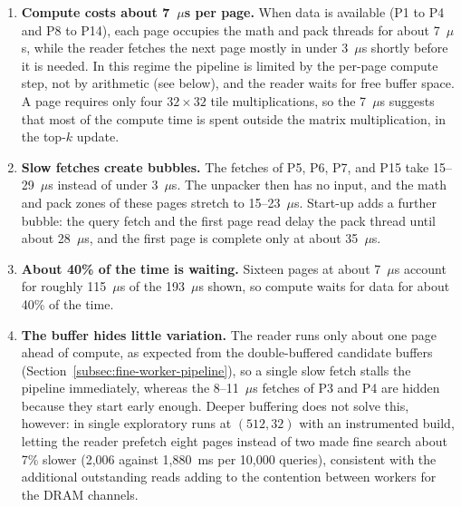 \begin{enumerate}
    \item \textbf{Compute costs about 7~\(\mu\)s per page.} When data is
    available (P1 to P4 and P8 to P14), each page occupies the math and pack
    threads for about 7~\(\mu\)s, while the reader fetches the next
    page mostly in under 3~\(\mu\)s shortly before it is needed. In this regime
    the pipeline is limited by the per-page compute step, not by arithmetic
    (see below), and the reader waits for free buffer space. A
    page requires only four \(32\times32\) tile multiplications, so the
    7~\(\mu\)s suggests that most of the compute time is spent outside the
    matrix multiplication, in the top-\(k\) update.
    \item \textbf{Slow fetches create bubbles.} The fetches of P5, P6, P7, and
    P15 take 15--29~\(\mu\)s instead of under 3~\(\mu\)s. The unpacker then has no
    input, and the math and pack zones of these pages stretch to
    15--23~\(\mu\)s. Start-up adds a further bubble: the query fetch and the
    first page read delay the pack thread until about 28~\(\mu\)s, and the
    first page is complete only at about 35~\(\mu\)s.
    \item \textbf{About 40\% of the time is waiting.} Sixteen pages at
    about 7~\(\mu\)s account for roughly 115~\(\mu\)s of the 193~\(\mu\)s
    shown, so compute waits for data for about 40\% of the time.
    \item \textbf{The buffer hides little variation.} The reader runs only
    about one page ahead of compute, as expected from the double-buffered
    candidate buffers (Section~\ref{subsec:fine-worker-pipeline}), so a
    single slow fetch stalls the
    pipeline immediately, whereas the 8--11~\(\mu\)s fetches of P3 and P4 are
    hidden because they start early enough. Deeper buffering does not solve
    this, however: in single exploratory runs at \((512,32)\) with an
    instrumented build, letting the reader prefetch eight pages instead of two
    made fine search about 7\% slower (2,006 against 1,880~ms per 10,000
    queries), consistent with the additional outstanding reads adding to the
    contention between workers for the DRAM channels.
\end{enumerate}

